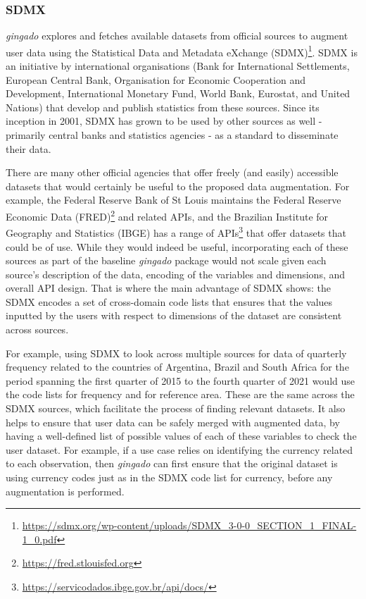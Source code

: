 \documentclass{article}
\begin{document}
\subsubsection{SDMX}

\textit{gingado} explores and fetches available datasets from official sources to augment user data using the Statistical Data and Metadata eXchange (SDMX)\footnote{\url{https://sdmx.org/wp-content/uploads/SDMX_3-0-0_SECTION_1_FINAL-1_0.pdf}}. SDMX is an initiative by international organisations (Bank for International Settlements, European Central Bank, Organisation for Economic Cooperation and Development, International Monetary Fund, World Bank, Eurostat, and United Nations) that develop and publish statistics from these sources. Since its inception in 2001, SDMX has grown to be used by other sources as well - primarily central banks and statistics agencies - as a standard to disseminate their data.

There are many other official agencies that offer freely (and easily) accessible datasets that would certainly be useful to the proposed data augmentation. For example, the Federal Reserve Bank of St Louis maintains the Federal Reserve Economic Data (FRED)\footnote{\url{https://fred.stlouisfed.org}} and related APIs, and the Brazilian Institute for Geography and Statistics (IBGE) has a range of APIs\footnote{\url{https://servicodados.ibge.gov.br/api/docs/}} that offer datasets that could be of use. While they would indeed be useful, incorporating each of these sources as part of the baseline \textit{gingado} package would not scale given each source's description of the data, encoding of the variables and dimensions, and overall API design.  That is where the main advantage of SDMX shows: the SDMX encodes a set of cross-domain code lists that ensures that the values inputted by the users with respect to dimensions of the dataset are consistent across sources.

For example, using SDMX to look across multiple sources for data of quarterly frequency related to the countries of Argentina, Brazil and South Africa for the period spanning the first quarter of 2015 to the fourth quarter of 2021 would use the code lists for frequency and for reference area. These are the same across the SDMX sources, which facilitate the process of finding relevant datasets. It also helps to ensure that user data can be safely merged with augmented data, by having a well-defined list of possible values of each of these variables to check the user dataset. For example, if a use case relies on identifying the currency related to each observation, then \textit{gingado} can first ensure that the original dataset is using currency codes just as in the SDMX code list for currency, before any augmentation is performed.
\end{document}
